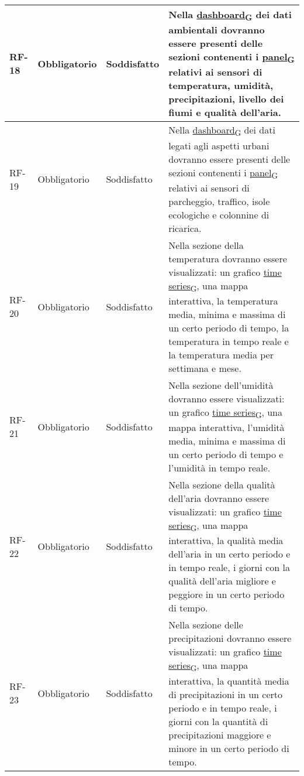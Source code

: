 \begin{longtable}{|>{\centering\arraybackslash}m{}|>{\centering\arraybackslash}m{}|>{\centering\arraybackslash}m{}|>{\centering\arraybackslash}m{}|}
	\\\hline
	RF-18           & Obbligatorio        & Soddisfatto & Nella \href{https://7last.github.io/docs/pb/documentazione-interna/glossario\#dashboard}{dashboard\textsubscript{G}} dei dati ambientali dovranno essere presenti delle sezioni contenenti i \href{https://7last.github.io/docs/pb/documentazione-interna/glossario\#panel}{panel\textsubscript{G}} relativi ai sensori di temperatura, umidità, precipitazioni, livello dei fiumi e qualità dell'aria.
	\\\hline
	RF-19           & Obbligatorio        & Soddisfatto & Nella \href{https://7last.github.io/docs/pb/documentazione-interna/glossario\#dashboard}{dashboard\textsubscript{G}} dei dati legati agli aspetti urbani dovranno essere presenti delle sezioni contenenti i \href{https://7last.github.io/docs/pb/documentazione-interna/glossario\#panel}{panel\textsubscript{G}} relativi ai sensori di parcheggio, traffico, isole ecologiche e colonnine di ricarica.
	\\\hline
	RF-20           & Obbligatorio        & Soddisfatto & Nella sezione della temperatura dovranno essere visualizzati: un grafico \href{https://7last.github.io/docs/pb/documentazione-interna/glossario\#time-series}{time series\textsubscript{G}}, una mappa interattiva, la temperatura media, minima e massima di un certo periodo di tempo, la temperatura in tempo reale e la temperatura media per settimana e mese.
	\\\hline
	RF-21           & Obbligatorio        & Soddisfatto & Nella sezione dell'umidità dovranno essere visualizzati: un grafico \href{https://7last.github.io/docs/pb/documentazione-interna/glossario\#time-series}{time series\textsubscript{G}}, una mappa interattiva, l'umidità media, minima e massima di un certo periodo di tempo e l'umidità in tempo reale.
	\\\hline
	RF-22           & Obbligatorio        & Soddisfatto & Nella sezione della qualità dell'aria dovranno essere visualizzati: un grafico \href{https://7last.github.io/docs/pb/documentazione-interna/glossario\#time-series}{time series\textsubscript{G}}, una mappa interattiva, la qualità media dell'aria in un certo periodo e in tempo reale, i giorni con la qualità dell'aria migliore e peggiore in un certo periodo di tempo.
	\\\hline
	RF-23           & Obbligatorio        & Soddisfatto & Nella sezione delle precipitazioni dovranno essere visualizzati: un grafico \href{https://7last.github.io/docs/pb/documentazione-interna/glossario\#time-series}{time series\textsubscript{G}}, una mappa interattiva, la quantità media di precipitazioni in un certo periodo e in tempo reale, i giorni con la quantità di precipitazioni maggiore e minore in un certo periodo di tempo.

\end{longtable}
